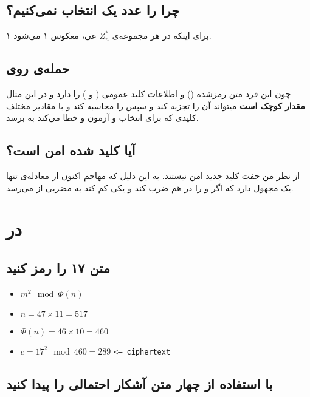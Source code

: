 \documentclass{article}
\begin{document}
\subsection{چرا  را عدد یک انتخاب نمی‌کنیم؟}
برای اینکه در هر مجموعه‌ی 
$Z^*_n$
عی، معکوس ۱ می‌شود ۱.

\subsection{حمله‌ی  روی }
چون این فرد متن رمزشده () و اطلاعات کلید عمومی ( و ) را دارد و در این مثال \textbf{مقدار  کوچک است} میتواند آن را تجزیه کند و سپس \lr{$\Phi$} را محاسبه کند و با مقادیر مختلف کلیدی که برای  انتخاب و آزمون و خطا می‌کند به  برسد.
\subsection{آیا کلید  شده امن است؟}
از نظر من جفت کلید جدید امن نیستند. به این دلیل که مهاجم اکنون از معادله‌ی 
تنها یک مجهول دارد که اگر 
و
را در هم ضرب کند و یکی کم کند به مضربی از 
می‌رسد.

\section{در }
\subsection{متن ۱۷ را رمز کنید}
\begin{latin}
\begin{itemize}
\item[] $m^2 \mod \Phi(n)$
\item[] $n = 47\times11 = 517$
\item[] $\Phi(n) = 46\times10 = 460$
\item[] $c = 17^2 \mod 460 = 289$  \texttt{<-- ciphertext}
\end{itemize}
\end{latin}

\subsection{با استفاده از  چهار متن آشکار احتمالی را پیدا کنید}
\end{document}
